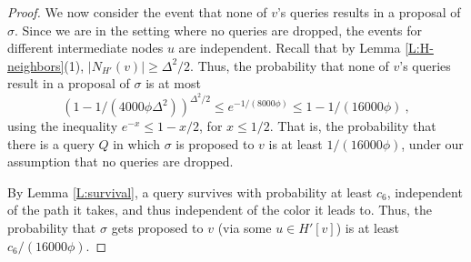\begin{proof}
We now consider the event that none of $v$'s queries results in a proposal of $\sigma$. Since we are in the setting where no queries are dropped, 
the events for different intermediate nodes $u$ are independent.
Recall that by Lemma \ref{L:H-neighbors}(1), $|N_{H'}(v)| \ge \Delta^2/2$.
Thus, the probability that none of $v$'s queries result in a proposal of $\sigma$ is at most
\[ (1-1/(4000\phi\Delta^2))^{\Delta^2/2} \le  e^{-1/(8000\phi)} \le 1-1/(16000\phi)\ , \]
using the inequality $e^{-x} \le 1-x/2$, for $x \le 1/2$.
That is, the probability that there is a query $Q$ in which $\sigma$ is proposed to $v$ is at least $1/(16000\phi)$, under our assumption that no queries are dropped.

By Lemma \ref{L:survival}, a query survives with probability at least $c_6$, independent of the path it takes, and thus independent of the color it leads to.
Thus, the probability that $\sigma$ gets proposed to $v$ (via some $u \in H'[v]$) is at least 
$c_6/(16000\phi)$.
\end{proof}

